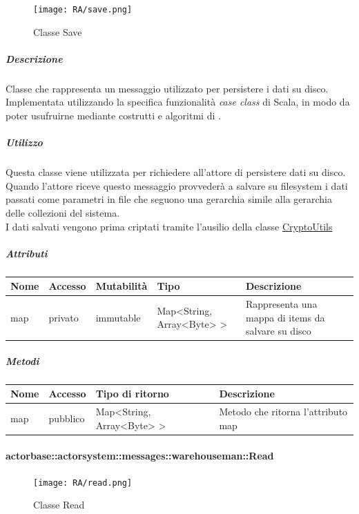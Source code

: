 \documentclass{scalatekids-article}
\begin{document}
\begin{figure}[H]
  \begin{center}
    \texttt{[image: RA/save.png]}
    \caption{Classe Save}
  \end{center}
\end{figure}

\subparagraph{Descrizione}
Classe che rappresenta un messaggio utilizzato per persistere i dati su disco.\\Implementata utilizzando la specifica funzionalità \textit{case class} di Scala,
in modo da poter usufruirne mediante costrutti e algoritmi di
.

\subparagraph{Utilizzo}
Questa classe viene utilizzata per richiedere all'attore di persistere dati
su disco. Quando l'attore riceve questo messaggio provvederà a salvare su
filesystem i dati passati come parametri in file che seguono una gerarchia
simile alla gerarchia delle collezioni del sistema.\\I dati salvati vengono prima criptati tramite l'ausilio della classe \hyperref[sec:actorbase::actorsystem::utils::CryptoUtils]{CryptoUtils}

\subparagraph{Attributi}
\begin{tabular}{| p{2cm} | p{1.5cm} | p{2cm} | p{3cm} | p{8.5cm} |}
  \hline
  Nome & Accesso & Mutabilità & Tipo & Descrizione\\
  \hline
  map & privato & immutable & Map<String, Array<Byte> > & Rappresenta una mappa di items da salvare su disco\\
  \hline
\end{tabular}

\subparagraph{Metodi}
\begin{tabular}{| p{3cm} | p{1.5cm} | p{3.5cm} | p{9cm} |}
  \hline
  Nome & Accesso & Tipo di ritorno & Descrizione\\
  \hline
  map & pubblico & Map<String, Array<Byte> > & Metodo che ritorna l'attributo map\\
  \hline
\end{tabular}

\paragraph{actorbase::actorsystem::messages::warehouseman::Read}
\label{sec:actorbase::actorsystem::messages::warehouseman::Read}

\begin{figure}[H]
  \begin{center}
    \texttt{[image: RA/read.png]}
    \caption{Classe Read}
  \end{center}
\end{figure}
\end{document}
